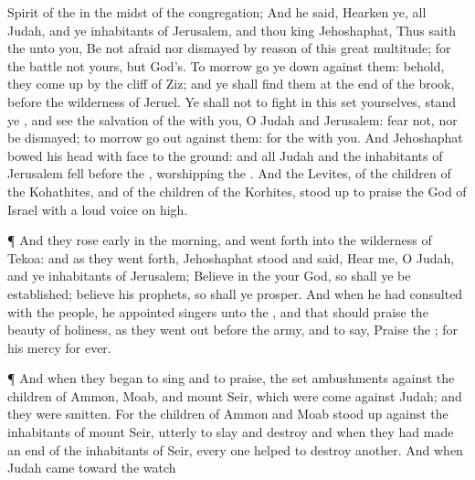 {Spirit of the
{} in the
midst of the
congregation;
And he
said,
Hearken ye, all
Judah, and ye
inhabitants of
Jerusalem, and thou
king
Jehoshaphat, Thus
saith the
{} unto you, Be not
afraid nor
dismayed by
reason of this
great
multitude; for the
battle
{} not yours, but
God’s.
To
morrow go ye
down against them: behold, they come
up by the
cliff of
Ziz; and ye shall
find them at the
end of the
brook,
before the
wilderness of
Jeruel.
Ye shall not
{} to
fight in
this
{}
set yourselves,
stand ye
{}, and
see the
salvation of the
{} with you, O
Judah and
Jerusalem:
fear not, nor be
dismayed; to
morrow go
out
against them: for the
{}
{} with you.
And
Jehoshaphat
bowed his head with
{}
face to the
ground: and all
Judah and the
inhabitants of
Jerusalem
fell
before the
{},
worshipping the
{}.
And the
Levites, of the
children of the
Kohathites, and of the
children of the
Korhites, stood
up to
praise the
{}
God of
Israel with a
loud
voice on
high.
\par }{\PP {}¶ And they rose
early in the
morning, and went
forth into the
wilderness of
Tekoa: and as they went
forth,
Jehoshaphat
stood and
said,
Hear me, O
Judah, and ye
inhabitants of
Jerusalem;
Believe in the
{} your
God, so shall ye be
established;
believe his
prophets, so shall ye
prosper.
And when he had
consulted with the
people, he
appointed
singers unto the
{}, and that should
praise the
beauty of
holiness, as they went
out
before the
army, and to
say,
Praise the
{}; for his
mercy
{} for
ever.
\par }{\PP {}¶ And
when they
began to
sing and to
praise, the
{}
set
ambushments against the
children of
Ammon,
Moab, and
mount
Seir, which were
come against
Judah; and they were
smitten.
For the
children of
Ammon and
Moab stood
up against the
inhabitants of
mount
Seir, utterly to
slay and
destroy
{} and when they had made an
end of the
inhabitants of
Seir, every
one
helped to
destroy
another.
And when
Judah
came toward the watch
}
